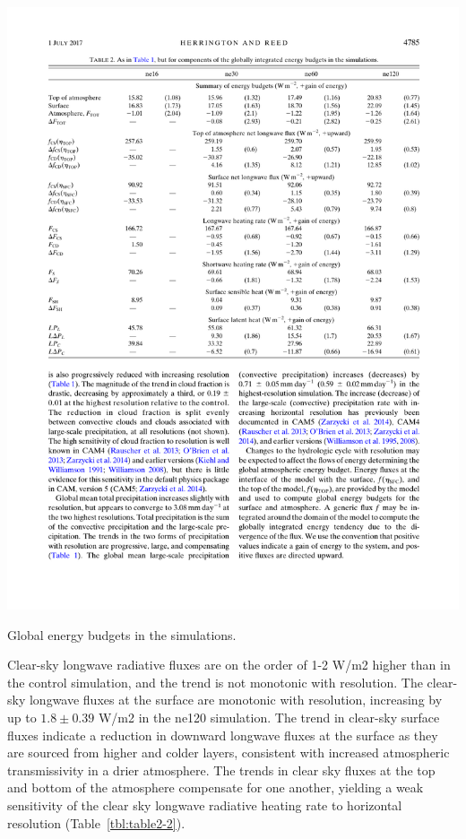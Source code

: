 \begin{table}[t]
\begin{center}
\noindent\includegraphics[width=40pc,angle=0]{chapter2/table2.pdf}\\
\end{center}
\caption{Global energy budgets in the simulations.}
\label{tbl:table2-2}
\end{table}

Clear-sky longwave radiative fluxes are on the order of 1-2 W/m2 higher than in the control simulation, and the trend is not monotonic with resolution. The clear-sky longwave fluxes at the surface are monotonic with resolution, increasing by up to $1.8 \pm 0.39$ W/m2 in the ne120 simulation. The trend in clear-sky surface fluxes indicate a reduction in downward longwave fluxes at the surface as they are sourced from higher and colder layers, consistent with increased atmospheric transmissivity in a drier atmosphere. The trends in clear sky fluxes at the top and bottom of the atmosphere compensate for one another, yielding a weak sensitivity of the clear sky longwave radiative heating rate to horizontal resolution (Table~\ref{tbl:table2-2}).

